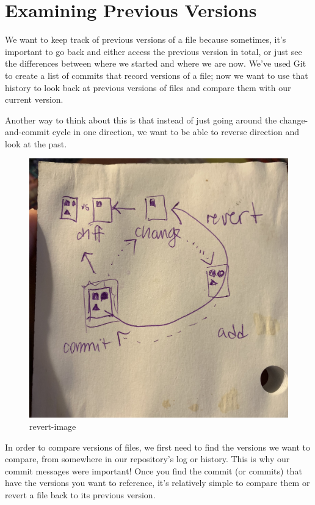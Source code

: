 \documentclass[]{Nemilov}
\begin{document}
\hypertarget{py-version-control-examining-versions}{%
\section{Examining Previous Versions}\label{py-version-control-examining-versions}}

We want to keep track of previous versions of a file because sometimes, it's
important to go back and either access the previous version in total, or just
see the differences between where we started and where we are now. We've used
Git to create a list of commits that record versions of a file; now we want to
use that history to look back at previous versions of files and compare them
with our current version.

Another way to think about this is that instead of just going
around the change-and-commit cycle in one direction, we want to be able to reverse direction and look at the past.

\begin{figure}
\centering
\includegraphics{figures/py-version-control/tmp-revert-cycle.jpeg}
\caption{revert-image}
\end{figure}

In order to compare versions of files, we first need to find the versions we
want to compare, from somewhere in our repository's log or history. This is
why our commit messages were important! Once you find the commit (or commits)
that have the versions you want to reference, it's relatively simple to compare them
or revert a file back to its previous version.
\end{document}
